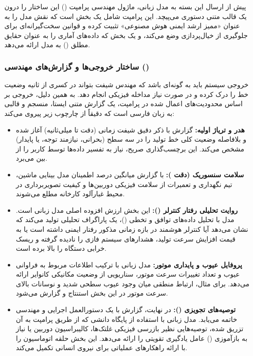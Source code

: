 \documentclass[a4paper, 10pt, twocolumn]{article}
\begin{document}
	پیش از ارسال این بسته به مدل زبانی، ماژول مهندسی پرامپت () این ساختار  را درون یک قالب متنی دستوری می‌پیچد. این پرامپت شامل یک بخش  است که نقش مدل را به عنوان «ممیز ارشد ایمنی هوش مصنوعی» تثبیت کرده و قوانین سخت‌گیرانه‌ای برای جلوگیری از خیال‌پردازی وضع می‌کند، و یک بخش  که داده‌های آماری را به عنوان حقایق مطلق () به مدل ارائه می‌دهد.
	
	\subsubsection{ساختار خروجی‌ها و گزارش‌های مهندسی ()}
	خروجی سیستم باید به گونه‌ای باشد که مهندس شیفت بتواند در کسری از ثانیه وضعیت خط را درک کرده و در صورت نیاز مداخله فیزیکی انجام دهد. به همین دلیل، خروجی  بر اساس محدودیت‌های اعمال شده در پرامپت، یک گزارش متنی ایستا، منسجم و قالبی به زبان فارسی است که دقیقاً از چارچوب زیر پیروی می‌کند:
	
	\begin{itemize}
		\item \textbf{هدر و تریاژ اولیه:} گزارش با ذکر دقیق شیفت زمانی (دقت تا میلی‌ثانیه) آغاز شده و بلافاصله وضعیت کلی خط تولید را در سه سطح (بحرانی، نیازمند توجه، یا پایدار) مشخص می‌کند. این برچسب‌گذاری صریح، نیاز به تفسیر داده‌ها توسط کاربر را از بین می‌برد.
		
		\item \textbf{سلامت سنسوریک (دقت ):} با گزارش میانگین درصد اطمینان مدل بینایی ماشین، تیم نگهداری و تعمیرات از سلامت فیزیکی دوربین‌ها و کیفیت تصویربرداری در محیط غبارآلود کارخانه مطلع می‌شوند.
		
		\item \textbf{روایت تحلیلی رفتار کنترلر ():} این بخش ارزش افزوده اصلی مدل زبانی است. مدل با تحلیل داده‌های توافق و تخطی ()، یک پاراگراف تحلیلی تولید می‌کند که نشان می‌دهد آیا کنترلر هوشمند در بازه زمانی مذکور رفتار ایمنی داشته است یا به قیمت افزایش سرعت تولید، هشدارهای سیستم فازی را نادیده گرفته و ریسک خرابی دستگاه را بالا برده است.
		
		\item \textbf{پروفایل عیوب و پایداری موتور:} مدل زبانی با ترکیب اطلاعات مربوط به فراوانی عیوب و تعداد تغییرات سرعت موتور، سناریویی از وضعیت مکانیکی کانوایر ارائه می‌دهد. برای مثال، ارتباط منطقی میان وجود عیوب سطحی شدید و نوسانات بالای سرعت موتور در این بخش استنتاج و گزارش می‌شود.
		
		\item \textbf{توصیه‌های تجویزی ():} در نهایت، گزارش با یک دستورالعمل اجرایی و مهندسی خاتمه می‌یابد. مدل زبانی با استفاده از پایگاه دانشی که از طریق پرامپت به آن تزریق شده، توصیه‌هایی نظیر بازرسی فیزیکی غلتک‌ها، کالیبراسیون دوربین یا نیاز به بازآموزی () عامل یادگیری تقویتی را ارائه می‌دهد. این بخش حلقه اتوماسیون را با ارائه راهکارهای عملیاتی برای نیروی انسانی تکمیل می‌کند.
	\end{itemize}
	
\end{document}
